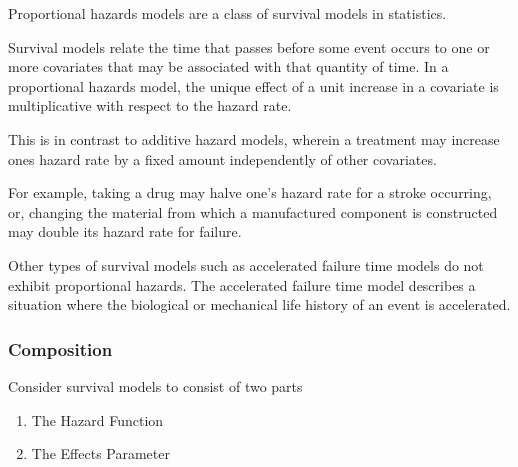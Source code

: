 Proportional hazards models are a class of survival models in statistics. 


Survival models relate the time that passes before some event occurs to one or more covariates that may be associated with 
that quantity of time. In a proportional hazards model, the unique effect of a unit increase in a covariate is multiplicative 
with respect to the hazard rate. 

This is in contrast to additive hazard models, wherein a treatment may increase ones hazard rate by a fixed amount independently of other
covariates.

For example, taking a drug may halve one's hazard rate for a stroke occurring, or, changing
the material from which a manufactured component is constructed may double its hazard rate for failure. 

Other types of survival models such as accelerated failure time models do not exhibit proportional hazards. 
The accelerated failure time model describes a situation where 
the biological or mechanical life history of an event is accelerated.

\subsubsection*{Composition}
Consider survival models to consist of two parts
\begin{enumerate}
\item The Hazard Function
\item The Effects Parameter
\end{enumerate}
